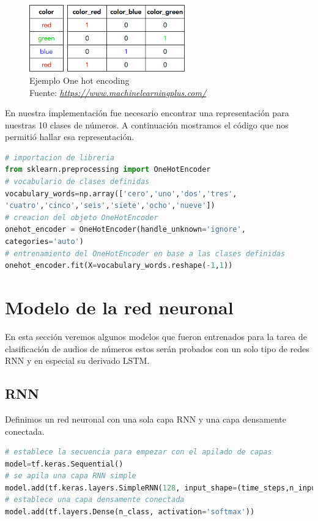 \begin{figure}[H]
	\centering
	\includegraphics[width=0.6\textwidth]{Figures/one_hot_encoding}
	\caption{Ejemplo One hot encoding \\ Fuente:  \href{https://www.machinelearningplus.com/machine-learning/caret-package/attachment/one-hot-encoding/}{\textit{https://www.machinelearningplus.com/}}}
	\label{one}
\end{figure} 
En nuestra implementación fue necesario encontrar una representación para nuestras 10 clases de números. A continuación mostramos el código que nos permitió hallar esa representación.
\begin{lstlisting}[language=Python,caption=one hot encoding,captionpos=b,xleftmargin=.05\textwidth]
# importacion de libreria
from sklearn.preprocessing import OneHotEncoder
# vocabulario de clases definidas
vocabulary_words=np.array(['cero','uno','dos','tres',
'cuatro','cinco','seis','siete','ocho','nueve'])
# creacion del objeto OneHotEncoder
onehot_encoder = OneHotEncoder(handle_unknown='ignore',
categories='auto')
# entrenamiento del OneHotEncoder en base a las clases definidas
onehot_encoder.fit(X=vocabulary_words.reshape(-1,1))
\end{lstlisting}

\section{Modelo de la red neuronal}

En esta sección  veremos algunos modelos que fueron entrenados para la tarea de clasificación de audios de números estos serán probados con un solo tipo de redes RNN y en especial su derivado LSTM.
\subsection{RNN}
Definimos un red neuronal con una sola capa RNN y una capa densamente conectada.

\begin{lstlisting}[language=Python,caption=Modelo LSTM,captionpos=b,xleftmargin=.05\textwidth]
# establece la secuencia para empezar con el apilado de capas
model=tf.keras.Sequential()
# se apila una capa RNN simple 
model.add(tf.keras.layers.SimpleRNN(128, input_shape=(time_steps,n_inputs)))
# establece una capa densamente conectada
model.add(tf.layers.Dense(n_class, activation='softmax'))

\end{lstlisting}


